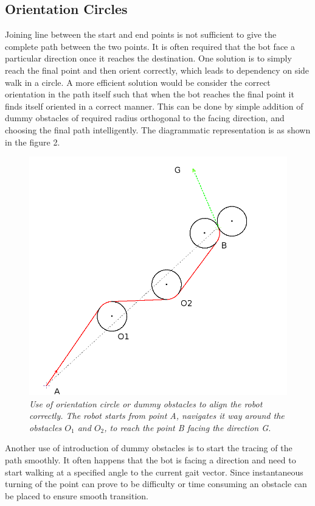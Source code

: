 \documentclass[letterpaper, 10 pt, conference]{ieeeconf}  %
\begin{document}
\subsection{Orientation Circles}
Joining line between the start and end points is not sufficient to give the complete path between the two points. It is often required that the bot face a particular direction once it reaches the destination. One solution is to simply reach the final point and then orient correctly, which leads to dependency on side walk in a circle. A more efficient solution would be consider the correct orientation in the path itself such that when the bot reaches the final point it finds itself oriented in a correct manner. This can be done by simple addition of dummy obstacles of required radius orthogonal to the facing direction, and choosing the final path intelligently. The diagrammatic representation is as shown in the figure 2. 
\begin{figure}[h]  
\begin{center}  
\includegraphics[scale=0.40]{orientation_circle2.JPG}  
\caption{\small \sl Use of orientation circle or dummy obstacles to align the robot correctly. The robot starts from point A, navigates it way around the obstacles $O_1$ and $O_2$, to reach the point B facing the direction G. \label{fig:orientation}}  
\end{center}  
\end{figure} 
Another use of introduction of dummy obstacles is to start the tracing of the path smoothly. It often happens that the bot is facing a direction and need to start walking at a specified angle to the current gait vector. Since instantaneous turning of the point can prove to be difficulty or time consuming an obstacle can be placed to ensure smooth transition.
\end{document}
